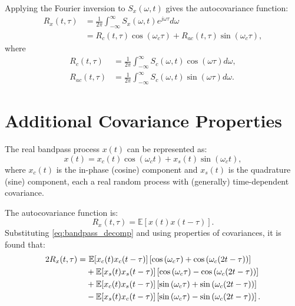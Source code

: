 \documentclass[12pt]{article}
\begin{document}
Applying the Fourier inversion to $S_x(\omega, t)$ gives the autocovariance function:
\begin{align}
R_x(t, \tau) &= \frac{1}{2\pi} \int_{-\infty}^{\infty} S_x(\omega, t) e^{j\omega \tau} d\omega \nonumber\\
&= R_c(t, \tau) \cos(\omega_c \tau) + R_{ac}(t, \tau) \sin(\omega_c \tau),
\label{eq:autocov_bandpass}
\end{align}
where
\begin{align}
R_c(t, \tau) &= \frac{1}{2\pi} \int_{-\infty}^{\infty} S_c(\omega, t) \cos(\omega \tau) d\omega, \label{eq:Rc}\\
R_{ac}(t, \tau) &= \frac{1}{2\pi} \int_{-\infty}^{\infty} S_c(\omega, t) \sin(\omega \tau) d\omega. \label{eq:Rac}
\end{align}

\section{Additional Covariance Properties}

The real bandpass process $x(t)$ can be represented as:
\begin{equation}
x(t) = x_c(t) \cos(\omega_c t) + x_s(t) \sin(\omega_c t),
\label{eq:bandpass_decomp}
\end{equation}
where $x_c(t)$ is the in-phase (cosine) component and $x_s(t)$ is the quadrature (sine) component, each a real random process with (generally) time-dependent covariance.

The autocovariance function is:
\begin{equation}
R_x(t, \tau) = \mathbb{E}[x(t)x(t-\tau)].
\end{equation}
Substituting \eqref{eq:bandpass_decomp} and using properties of covariances, it is found that:
\begin{align}
2 R_x(t, \tau) =&\ \mathbb{E}[x_c(t)x_c(t-\tau)] \left[\cos\left(\omega_c \tau\right) + \cos\left(\omega_c (2t-\tau)\right)\right] \notag\\
&+ \mathbb{E}[x_s(t)x_s(t-\tau)] \left[\cos\left(\omega_c \tau\right) - \cos\left(\omega_c (2t-\tau)\right)\right] \notag\\
&+ \mathbb{E}[x_c(t)x_s(t-\tau)] \left[\sin\left(\omega_c \tau\right) + \sin\left(\omega_c (2t-\tau)\right)\right] \notag\\
&- \mathbb{E}[x_s(t)x_c(t-\tau)] \left[\sin\left(\omega_c \tau\right) - \sin\left(\omega_c (2t-\tau)\right)\right].
\label{eq:covariance_expanded}
\end{align}
\end{document}

